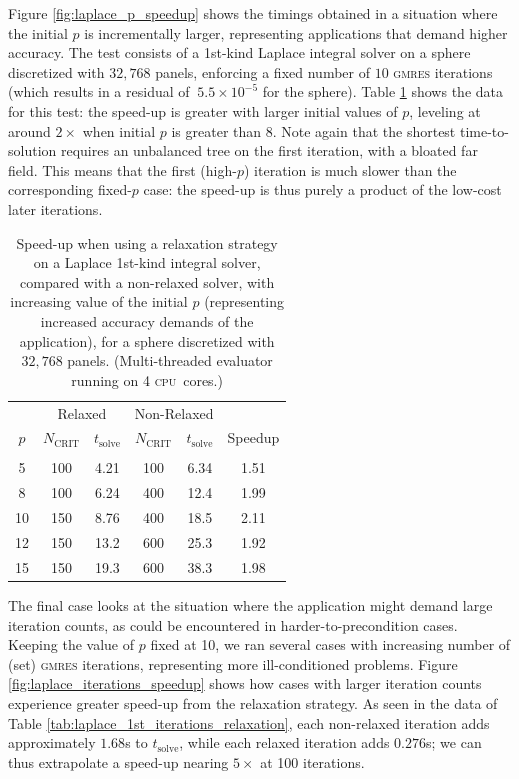 \documentclass[final,leqno,]{siamltex1213}
\newcommand{\cpu}{\textsc{cpu}}
\newcommand{\ncrit}{N_{\text{CRIT}}}
\newcommand{\tsolve}{t_{\text{solve}}}
\newcommand{\gmres}{\textsc{gmres}\xspace}
\begin{document}
Figure \ref{fig:laplace_p_speedup} shows the timings obtained in a situation where the initial $p$ is incrementally larger, representing applications that demand higher accuracy. The test consists of a 1st-kind Laplace integral solver on a sphere discretized with $32,768$ panels, enforcing a fixed number of $10$ \gmres iterations (which results in a residual of $~5.5\times 10^{-5}$ for the sphere). Table \ref{tab:laplace_1st_p_relaxation} shows the data for this test: the speed-up is greater with larger initial values of $p$, leveling at around $2\times$ when initial $p$ is greater than 8. Note again that the shortest time-to-solution requires an unbalanced tree on the first iteration, with a bloated far field. This means that the first (high-$p$) iteration is much slower than the corresponding fixed-$p$ case: the speed-up is thus purely a product of the low-cost later iterations.

\begin{table}[h]
\footnotesize
\begin{center}
\begin{tabular}{c|cc|cc|c}
  & \multicolumn{2}{c|}{Relaxed} & \multicolumn{2}{c|}{Non-Relaxed} & \\
  $p$ & $\ncrit$ & $\tsolve$ & $\ncrit$ & $\tsolve$ & Speedup \\
   \hline
   & & & & & \\
  5 & 100 & 4.21 & 100 & 6.34 & 1.51 \\
  8 & 100 & 6.24 & 400 & 12.4 & 1.99 \\
  10 & 150 & 8.76 & 400 & 18.5 & 2.11 \\
  12 & 150 & 13.2  & 600 & 25.3 & 1.92 \\
  15 & 150 & 19.3 & 600 & 38.3 & 1.98 \\
 
\end{tabular}
\end{center}
\caption{Speed-up when using a relaxation strategy on a Laplace 1st-kind integral solver, compared with a non-relaxed solver, with increasing value of the initial $p$ (representing increased accuracy demands of the application), for a sphere discretized with $32,768$ panels. (Multi-threaded evaluator running on 4 \cpu\ cores.)}
\label{tab:laplace_1st_p_relaxation}
\end{table}%

The final case looks at the situation where the application might demand large iteration counts, as could be encountered in harder-to-precondition cases. Keeping the value of $p$ fixed at 10, we ran several cases with increasing number of (set) \gmres iterations, representing more ill-conditioned problems. Figure \ref{fig:laplace_iterations_speedup} shows how cases with larger iteration counts experience greater speed-up from the relaxation strategy. As seen in the data of Table \ref{tab:laplace_1st_iterations_relaxation}, each non-relaxed iteration adds approximately $1.68$s to $\tsolve$, while each relaxed iteration adds $0.276$s; we can thus extrapolate a speed-up nearing $5\times$ at 100 iterations.
\end{document}

